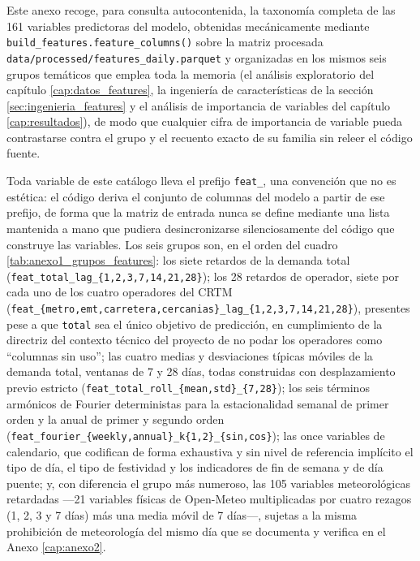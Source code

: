 \begin{sloppypar}
Este anexo recoge, para consulta autocontenida, la taxonomía completa de las 161
variables predictoras del modelo, obtenidas mecánicamente mediante
\texttt{build\_features.feature\_columns()} sobre la matriz procesada
\texttt{data/\allowbreak{}processed/\allowbreak{}features\_daily.parquet} y organizadas en los mismos seis grupos
temáticos que emplea toda la memoria (el análisis exploratorio del capítulo
\ref{cap:datos_features}, la ingeniería de características de la sección
\ref{sec:ingenieria_features} y el análisis de importancia de variables del capítulo
\ref{cap:resultados}), de modo que cualquier cifra de importancia de variable pueda
contrastarse contra el grupo y el recuento exacto de su familia sin releer el código
fuente.

Toda variable de este catálogo lleva el prefijo \texttt{feat\_}, una convención que no es
estética: el código deriva el conjunto de columnas del modelo a partir de ese prefijo, de
forma que la matriz de entrada nunca se define mediante una lista mantenida a mano que
pudiera desincronizarse silenciosamente del código que construye las variables. Los seis
grupos son, en el orden del cuadro \ref{tab:anexo1_grupos_features}: los siete retardos de
la demanda total
(\texttt{feat\_total\_lag\_\{1,2,3,7,14,21,28\}}); los 28 retardos de operador, siete por
cada uno de los cuatro operadores del CRTM
(\texttt{feat\_\allowbreak{}\{metro,emt,carretera,cercanias\}\_\allowbreak{}lag\_\{1,2,3,7,14,21,28\}}), presentes pese a que
\texttt{total} sea el único objetivo de predicción, en cumplimiento de la directriz del
contexto técnico del proyecto de no podar los operadores como ``columnas sin uso''; las
cuatro medias y desviaciones típicas móviles de la demanda total, ventanas de 7 y 28 días,
todas construidas con desplazamiento previo estricto
(\texttt{feat\_total\_roll\_\{mean,std\}\_\{7,28\}}); los seis términos armónicos de
Fourier deterministas para la estacionalidad semanal de primer orden y la anual de
primer y segundo orden (\texttt{feat\_fourier\_\{weekly,annual\}\_k\{1,2\}\_\{sin,cos\}});
las once variables de calendario, que codifican de forma exhaustiva y sin nivel de
referencia implícito el tipo de día, el tipo de festividad y los indicadores de fin de
semana y de día puente; y, con diferencia el grupo más numeroso, las 105 variables
meteorológicas retardadas —21 variables físicas de Open-Meteo multiplicadas por cuatro
rezagos (1, 2, 3 y 7 días) más una media móvil de 7 días—, sujetas a la misma
prohibición de meteorología del mismo día que se documenta y verifica en el Anexo
\ref{cap:anexo2}.


\end{sloppypar}

